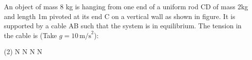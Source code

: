 \item An object of mass 8 kg is hanging from one end of a uniform rod CD of mass 2kg and length 1m pivoted at its end C on a vertical wall as shown in figure. It is supported by a cable AB such that the system is in equilibrium. The tension in the cable is (Take \(g = 10 \, \text{m/s}^2\)):
    \begin{center}
    \end{center}
    \begin{tasks}(2)
         N
         N
         N
         N
    \end{tasks}